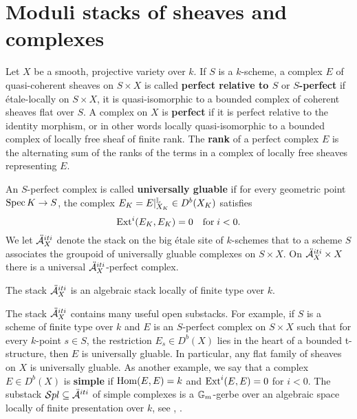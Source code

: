 \section{Moduli stacks of sheaves and complexes}
Let $X$ be a smooth, projective variety over $k$. If $S$ is a $k$-scheme, a complex $E$ of quasi-coherent sheaves on $S \times X$ is called \textbf{perfect relative to $S$} or \textbf{$S$-perfect} if \'etale-locally on $S \times X$, it is quasi-isomorphic to a bounded complex of coherent sheaves flat over $S$. A complex on $X$ is \textbf{perfect} if it is perfect relative to the identity morphism, or in other words locally quasi-isomorphic to a bounded complex of locally free sheaf of finite rank. The \textbf{rank} of a perfect complex $E$ is the alternating sum of the ranks of the terms in a complex of locally free sheaves representing $E$.

An $S$-perfect complex is called \textbf{universally gluable} if for every geometric point $\operatorname{\mathrm{Spec}} K \to S$, the complex $E_K = E|^{\mathbb{L}}_{X_K} \in D^b(X_K)$ satisfies
\[ \mathrm{Ext}^i(E_K, E_K) = 0 \quad \text{for} \; i < 0. \]
We let $\ddot{\mathcal{A}}^{iti}_X$ denote the stack on the big \'etale site of $k$-schemes that to a scheme $S$ associates the groupoid of universally gluable complexes on $S \times X$. On $\ddot{\mathcal{A}}^{iti}_X \times X$ there is a universal $\ddot{\mathcal{A}}^{iti}_X$-perfect complex.
\begin{thm}\label{motherofallmoduli}
    The stack $\ddot{\mathcal{A}}^{iti}_X$ is an algebraic stack locally of finite type over $k$.
\end{thm}
The stack $\ddot{\mathcal{A}}^{iti}_X$ contains many useful open substacks.
For example, if $S$ is a scheme of finite type over $k$ and $E$ is an $S$-perfect complex on $S \times X$ such that for every $k$-point $s \in S$, the restriction $E_s \in D^b(X)$ lies in the heart of a bounded t-structure, then $E$ is universally gluable. In particular, any flat family of sheaves on $X$ is universally gluable. As another example, we say that a complex $E \in D^b(X)$ is \textbf{simple} if $\mathrm{Hom}(E,E) = k$ and $\mathrm{Ext}^i(E,E) = 0$ for $i < 0$. The substack $\mathcal{S} pl \subseteq \ddot{\mathcal{A}}^{iti}$ of simple complexes is a $\mathbb{G}_m$-gerbe over an algebraic space locally of finite presentation over $k$, see \cite{inaba}, \cite[Corollary 4.3.3]{lie06}.

